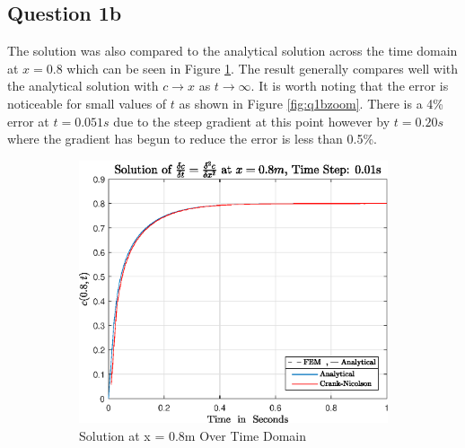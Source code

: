 \documentclass[11pt]{article}
\begin{document}
\FloatBarrier
\subsection{Question 1b}
The solution was also compared to the analytical solution across the time domain at $x = 0.8$ which can be seen in Figure \ref{fig:q1b}. The result generally compares well with the analytical solution with $c \rightarrow x $ as  $t \rightarrow \infty $. It is worth noting that the error is noticeable for small values of $t$ as shown in Figure \ref{fig:q1bzoom}. There is a 4\% error at $t = 0.051s$ due to the steep gradient at this point however by $t = 0.20s $ where the gradient has begun to reduce the error is less than 0.5\%. 



\begin{figure}[h!] 
        \centering
        \begin{subfigure}[b]{0.475\textwidth}
            \centering
            \includegraphics[width=\textwidth]{epsQ1b}
            \caption[]%
            {{\small Solution at x = 0.8m Over Time Domain }}    
            \label{fig:q1b}
        \end{subfigure}
        \hfill
        \begin{subfigure}[b]{0.475\textwidth}  
            \centering 

\end{subfigure}
\end{figure}
\end{document}
